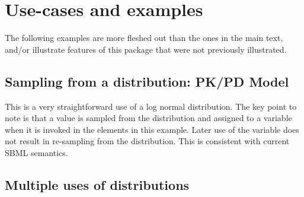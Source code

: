 \documentclass[draftspec]{sbmlpkgspec}
\newcommand{\mathml}{MathML\xspace}
\newcommand{\controversial}{\marginpar{\hspace*{34pt}\raisebox{-0.5ex}{\Large?}}}
\begin{document}
\section{Use-cases and examples}

The following examples are more fleshed out than the ones in the main text, and/or illustrate features of this package that were not previously illustrated.

\subsection{Sampling from a distribution: PK/PD Model}

This is a very straightforward use of a log normal distribution. The key point to note is that a value is sampled from
the distribution and assigned to a variable when it is invoked in the
 elements in this example. Later use of the variable
does not result in re-sampling from the distribution. This is
consistent with current SBML semantics.








\subsection{Multiple uses of distributions }
\end{document}
